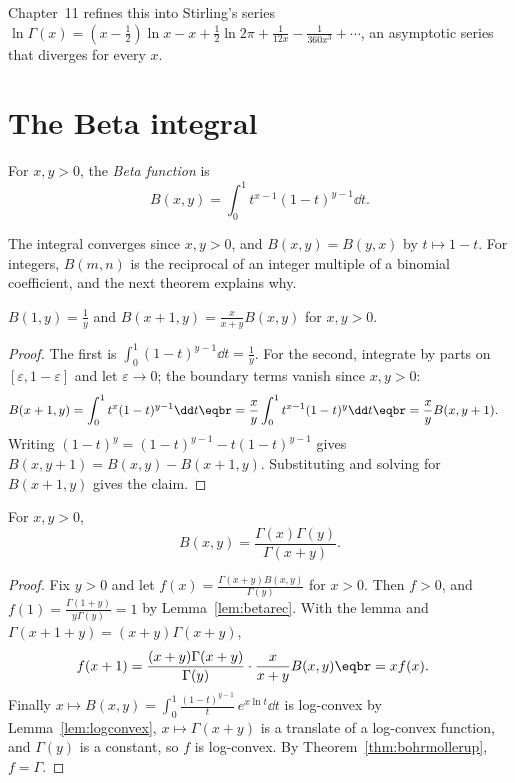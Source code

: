 Chapter~11 refines this into Stirling's series
$\ln\Gamma(x)=(x-\frac12)\ln x-x+\frac12\ln2\pi+\frac1{12x}-\frac1{360x^3}+\cdots$, an asymptotic series that diverges for every $x$.

\section{The Beta integral}

\begin{definition}
For $x,y>0$, the \emph{Beta function} is
\[
B(x,y)=\int_0^1t^{x-1}(1-t)^{y-1}\dd t.
\]
\end{definition}

The integral converges since $x,y>0$, and $B(x,y)=B(y,x)$ by $t\mapsto1-t$. For integers, $B(m,n)$ is the reciprocal of
an integer multiple of a binomial coefficient, and the next theorem explains why.

\begin{lemma}\label{lem:betarec}
$B(1,y)=\frac1y$ and $B(x+1,y)=\frac x{x+y}B(x,y)$ for $x,y>0$.
\end{lemma}
\begin{proof}
The first is $\int_0^1(1-t)^{y-1}\dd t=\frac1y$. For the second, integrate by parts on $[\varepsilon,1-\varepsilon]$ and let $\varepsilon\to0$; the
boundary terms vanish since $x,y>0$:
\[
\begin{aligned}B(x+1,y)&=\int_0^1t^x(1-t)^{y-1}\dd t\eqbr=\frac xy\int_0^1t^{x-1}(1-t)^y\dd t\eqbr=\frac xyB(x,y+1).\end{aligned}
\]
Writing $(1-t)^y=(1-t)^{y-1}-t(1-t)^{y-1}$ gives $B(x,y+1)=B(x,y)-B(x+1,y)$. Substituting and solving for $B(x+1,y)$ gives the
claim.
\end{proof}

\begin{theorem}[Euler]\label{thm:betagamma}
For $x,y>0$,
\[
B(x,y)=\frac{\Gamma(x)\Gamma(y)}{\Gamma(x+y)}.
\]
\end{theorem}
\begin{proof}
Fix $y>0$ and let $f(x)=\frac{\Gamma(x+y)B(x,y)}{\Gamma(y)}$ for $x>0$. Then $f>0$, and $f(1)=\frac{\Gamma(1+y)}{y\Gamma(y)}=1$ by
Lemma~\ref{lem:betarec}. With the lemma and $\Gamma(x+1+y)=(x+y)\Gamma(x+y)$,
\[
\begin{aligned}f(x+1)&=\frac{(x+y)\Gamma(x+y)}{\Gamma(y)}\cdot\frac x{x+y}B(x,y)\eqbr=xf(x).\end{aligned}
\]
Finally $x\mapsto B(x,y)=\int_0^1\frac{(1-t)^{y-1}}t\,e^{x\ln t}\dd t$ is log-convex by Lemma~\ref{lem:logconvex}, $x\mapsto\Gamma(x+y)$ is a
translate of a log-convex function, and $\Gamma(y)$ is a constant, so $f$ is log-convex. By Theorem~\ref{thm:bohrmollerup}, $f=\Gamma$.
\end{proof}

